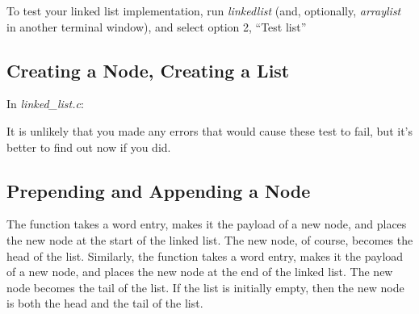 To test your linked list implementation, run \textit{linkedlist} (and, optionally, \textit{arraylist} in another terminal window),
and select option 2, ``Test list''


\subsection{Creating a Node, Creating a List}

In \textit{linked\_list.c}:

\begin{description}
\end{description}

It is unlikely that you made any errors that would cause these test to fail,
but it's better to find out now if you did.


\subsection{Prepending and Appending a Node}

The  function takes a word entry, makes it the payload of a new node, and places the new node at the start of the linked list.
The new node, of course, becomes the head of the list.
Similarly, the  function takes a word entry, makes it the payload of a new node, and places the new node at the end of the linked list.
The new node becomes the tail of the list.
If the list is initially empty, then the new node is both the head and the tail of the list.

